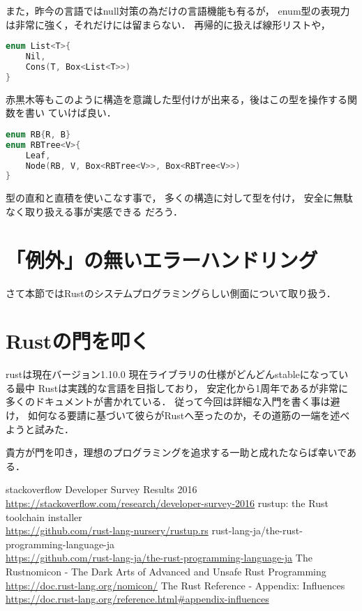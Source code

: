 また，昨今の言語ではnull対策の為だけの言語機能も有るが，
enum型の表現力は非常に強く，それだけには留まらない．
再帰的に扱えば線形リストや，
\begin{lstlisting}[language={C++},caption=線形リスト,label=list_t]
enum List<T>{
    Nil,
    Cons(T, Box<List<T>>)
}
\end{lstlisting}
赤黒木等もこのように構造を意識した型付けが出来る，後はこの型を操作する関数を書い
ていけば良い．
\begin{lstlisting}[language={C++},caption=線形リスト,label=list_t]
enum RB{R, B}
enum RBTree<V>{
    Leaf,
    Node(RB, V, Box<RBTree<V>>, Box<RBTree<V>>)
}
\end{lstlisting}

型の直和と直積を使いこなす事で，
多くの構造に対して型を付け，
安全に無駄なく取り扱える事が実感できる
だろう．

\section{「例外」の無いエラーハンドリング}
さて本節ではRustのシステムプログラミングらしい側面について取り扱う．

\section{Rustの門を叩く}
rustは現在バージョン1.10.0
現在ライブラリの仕様がどんどんstableになっている最中
Rustは実践的な言語を目指しており，
安定化から1周年であるが非常に多くのドキュメントが書かれている．
従って今回は詳細な入門を書く事は避け，
如何なる要請に基づいて彼らがRustへ至ったのか，その道筋の一端を述べようと試みた．

貴方が門を叩き，理想のプログラミングを追求する一助と成れたならば幸いである．

\begin{thebibliography}{9}
 stackoverflow Developer Survey Results 2016 \\
  \url{https://stackoverflow.com/research/developer-survey-2016}
 rustup: the Rust toolchain installer \\
  \url{https://github.com/rust-lang-nursery/rustup.rs}
 rust-lang-ja/the-rust-programming-language-ja \\
  \url{https://github.com/rust-lang-ja/the-rust-programming-language-ja}
 The Rustnomicon - The Dark Arts of Advanced and Unsafe Rust Programming \\
  \url{https://doc.rust-lang.org/nomicon/}
 The Rust Reference - Appendix: Influences \\
  \url{https://doc.rust-lang.org/reference.html#appendix-influences}
\end{thebibliography}
